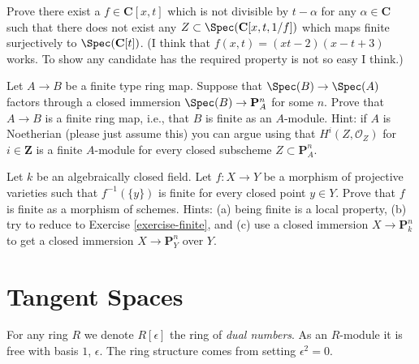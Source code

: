 \begin{exercise}
\label{exercise-no-quasi-section}
Prove there exist a $f \in \mathbf{C}[x, t]$ which is not divisible
by $t - \alpha$ for any $\alpha \in \mathbf{C}$ such that
there does not exist any $Z \subset \Spec(\mathbf{C}[x, t, 1/f])$
which maps finite surjectively to $\Spec(\mathbf{C}[t])$.
(I think that $f(x, t) = (xt - 2)(x - t + 3)$ works. To show any candidate
has the required property is not so easy I think.)
\end{exercise}

\begin{exercise}
\label{exercise-finite}
Let $A \to B$ be a finite type ring map. Suppose that
$\Spec(B) \to \Spec(A)$ factors through a closed
immersion $\Spec(B) \to \mathbf{P}^n_A$ for some $n$.
Prove that $A \to B$ is a finite ring map, i.e., that
$B$ is finite as an $A$-module.
Hint: if $A$ is Noetherian (please just assume this)
you can argue using that $H^i(Z, \mathcal{O}_Z)$ for $i \in \mathbf{Z}$
is a finite $A$-module for every closed subscheme
$Z \subset \mathbf{P}^n_A$.
\end{exercise}

\begin{exercise}
\label{exercise-projective-finite}
Let $k$ be an algebraically closed field.
Let $f : X \to Y$ be a morphism of projective
varieties such that $f^{-1}(\{y\})$ is finite for
every closed point $y \in Y$.
Prove that $f$ is finite as a morphism of schemes.
Hints: (a) being finite is a local property,
(b) try to reduce to Exercise \ref{exercise-finite}, and
(c) use a closed immersion $X \to \mathbf{P}^n_k$ to get
a closed immersion $X \to \mathbf{P}^n_Y$ over $Y$.
\end{exercise}






\section{Tangent Spaces}
\label{section-tangent-space}

\begin{definition}
\label{definition-dual-numbers}
For any ring $R$ we denote $R[\epsilon]$ the ring
of {\it dual numbers}. As an $R$-module it is free with
basis $1$, $\epsilon$. The ring structure comes from setting
$\epsilon^2 = 0$.
\end{definition}

